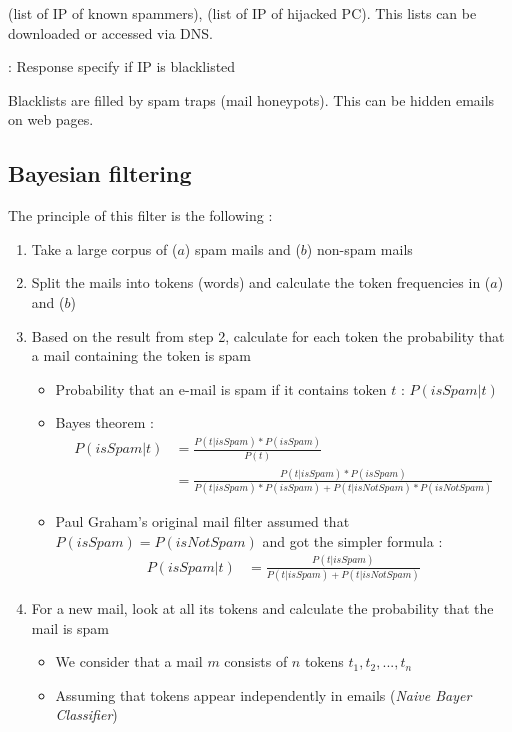  (list of IP of known spammers),  (list of IP of hijacked PC). This lists can be downloaded or accessed via DNS.

 : Response specify if IP is blacklisted

Blacklists are filled by spam traps (mail honeypots). This can be hidden emails on web pages.

\subsection{Bayesian filtering}

The principle of this filter is the following :
\begin{enumerate}
    \item Take a large corpus of ($a$) spam mails and ($b$) non-spam mails
    \item Split the mails into tokens (words) and calculate the token frequencies in ($a$) and ($b$)
    \item Based on the result from step 2, calculate for each token the probability that a mail containing the token is spam
    \begin{itemize}
        \item Probability that an e-mail is spam if it contains token $t$ : $P(isSpam | t)$
        \item Bayes theorem :
        \begin{align*}
        P(isSpam | t) &= \frac{P(t | isSpam) * P(isSpam)}{P(t)}\\
                      &= \frac{P(t | isSpam) * P(isSpam)}{P(t | isSpam) * P(isSpam) + P(t | isNotSpam) * P(isNotSpam)}
        \end{align*}
        \item Paul Graham's original mail filter assumed that $P(isSpam) = P(isNotSpam)$ and got the simpler formula :
        \begin{align*}
        P(isSpam | t) &= \frac{P(t | isSpam)}{P(t | isSpam) + P(t | isNotSpam)}
        \end{align*}
    \end{itemize}
    \item For a new mail, look at all its tokens and calculate the probability that the mail is spam
    \begin{itemize}
        \item We consider that a mail $m$ consists of $n$ tokens $t_1, t_2, ..., t_n$
        \item Assuming that tokens appear independently in emails (\textit{Naive Bayer Classifier})

\end{itemize}
\end{enumerate}
